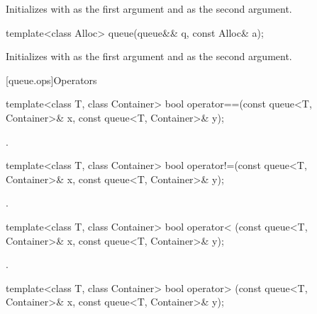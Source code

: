 \begin{itemdescr}
\pnum
\effects
Initializes  with  as the first argument and  as the
second argument.
\end{itemdescr}

\begin{itemdecl}
template<class Alloc> queue(queue&& q, const Alloc& a);
\end{itemdecl}

\begin{itemdescr}
\pnum
\effects
Initializes  with  as the first argument and 
as the second argument.
\end{itemdescr}

[queue.ops]{Operators}

%
\begin{itemdecl}
template<class T, class Container>
  bool operator==(const queue<T, Container>& x, const queue<T, Container>& y);
\end{itemdecl}

\begin{itemdescr}
\pnum
\returns
{}.
\end{itemdescr}

%
\begin{itemdecl}
template<class T, class Container>
  bool operator!=(const queue<T, Container>& x,  const queue<T, Container>& y);
\end{itemdecl}

\begin{itemdescr}
\pnum
\returns
{}.
\end{itemdescr}

%
\begin{itemdecl}
template<class T, class Container>
  bool operator< (const queue<T, Container>& x, const queue<T, Container>& y);
\end{itemdecl}

\begin{itemdescr}
\pnum
\returns
{}.
\end{itemdescr}

%
\begin{itemdecl}
template<class T, class Container>
  bool operator> (const queue<T, Container>& x, const queue<T, Container>& y);
\end{itemdecl}

